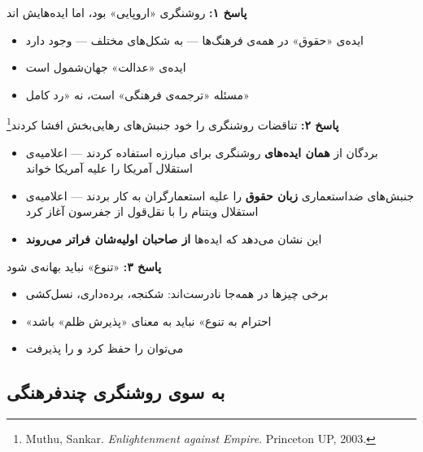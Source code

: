 \begin{tcolorbox}[successbox, title={دفاع از جهان‌شمولی انتقادی}]
\textbf{پاسخ ۱:} روشنگری «اروپایی» بود، اما ایده‌هایش ‌اند
\begin{itemize}
\item ایده‌ی «حقوق» در همه‌ی فرهنگ‌ها — به شکل‌های مختلف — وجود دارد
\item ایده‌ی «عدالت» جهان‌شمول است
\item مسئله «ترجمه‌ی فرهنگی» است، نه «رد کامل»
\end{itemize}

\tcblower

\textbf{پاسخ ۲:} تناقضات روشنگری را خود جنبش‌های رهایی‌بخش افشا
کردند\footnote{Muthu, Sankar. \textit{Enlightenment against Empire}.
Princeton UP, 2003.}
\begin{itemize}
\item بردگان از \textbf{همان ایده‌های} روشنگری برای مبارزه استفاده کردند
  —  اعلامیه‌ی استقلال آمریکا را علیه آمریکا خواند
\item جنبش‌های ضداستعماری \textbf{زبان حقوق} را علیه استعمارگران به
  کار بردند —  اعلامیه‌ی استقلال ویتنام را با نقل‌قول
  از جفرسون آغاز کرد
\item این نشان می‌دهد که ایده‌ها \textbf{از صاحبان اولیه‌شان فراتر
  می‌روند}
\end{itemize}

\tcblower

\textbf{پاسخ ۳:} «تنوع» نباید بهانه‌ی  شود
\begin{itemize}
\item برخی چیزها در همه‌جا نادرست‌اند: شکنجه، برده‌داری، نسل‌کشی
\item «احترام به تنوع» نباید به معنای «پذیرش ظلم» باشد
\item می‌توان  را حفظ کرد و
   را پذیرفت
\end{itemize}
\end{tcolorbox}


\subsection{به سوی روشنگری چندفرهنگی}

